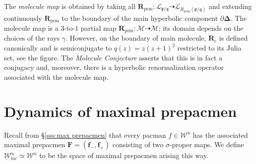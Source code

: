 \documentclass{amsart}
\newcommand{\1}{{\mathbb 1 }}
\newcommand\LL{{\mathcal L}}
\newcommand{\Mandel}{{\mathcal{M}}}
\newcommand\HH{\boldsymbol{\Delta}}%
\newcommand\mRR{\boldsymbol R}%
\newcommand\prm{{\operatorname{prm}}}
\newcommand\cRRc{R_{\prm}}%
\newcommand\mRRc{ \boldsymbol R_{\prm}}%
\newcommand{\bF}{{\mathbf F}}
\newcommand{\bbf}{{\mathbf f}}
\newcommand{\pp}{\mathfrak{p}}
\renewcommand{\qq}{\mathfrak{q}}
\def\loc{{\mathrm{loc}}}
\newcommand\WW{\mathcal{W}}
\newcommand\UnstLoc{{\boldsymbol{\mathcal{W}}^u_\loc}}
\theoremstyle{remark}
\numberwithin{equation}{section}
\theoremstyle{definition}
\theoremstyle{nonumberbreak}
\begin{document}
The \emph{molecule map} is obtained by taking all $\mRRc\colon \LL_{ \pp/\qq}\dashrightarrow \LL_{ \cRRc(\pp/\qq)}$ and extending continuously $\mRRc$ to the boundary of the main hyperbolic component $\partial \HH$. The molecule map is a $3$-to-$1$ partial map $\mRRc\colon \Mandel \dashrightarrow \Mandel$; its domain depends on the choices of the rays $\gamma$. However, on the boundary of main molecule, $\mRR_c$ is defined canonically and is semiconjugate to $q(z)=z(z+1)^2$ restricted to its Julia set, see the figure. The \emph{Molecule Conjecture} asserts that this is in fact a conjugacy and, moreover, there is a hyperbolic renormalization operator associated with the molecule map.



\section{Dynamics of maximal prepacmen}
\label{s:max prep}
Recall from \S\ref{sss:max prepacmen} that every pacman $f\in \WW^u$ has the associated maximal prepacmen $\bF=(\bbf_-,\bbf_+)$ consisting of two $\sigma$-proper maps. We define $\UnstLoc\simeq \WW^u$ to be the space of maximal prepacmen arising this way. 
\end{document}
